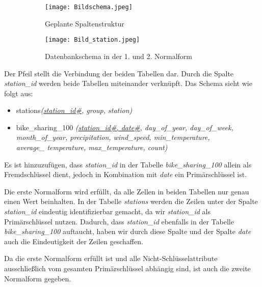 \documentclass[a4paper, 12pt]{article}
\begin{document}
\begin{figure}[ht]
    \centering
     \begin{subfigure}{0.25\textwidth}
        \centering
        \texttt{[image: Bildschema.jpeg]}
        \par Geplante Spaltenstruktur 
    \end{subfigure}
    \hfill
     \begin{subfigure}{0.72\textwidth}
        \centering
        \texttt{[image: Bild\_station.jpeg]}
        \par Datenbankschema in der 1. und 2. Normalform
    \end{subfigure}
\end{figure}

\newpage
Der Pfeil stellt die Verbindung der beiden Tabellen dar. Durch die Spalte \textit{station\_id} werden beide Tabellen miteinander verknüpft. Das Schema sieht wie folgt aus: 

\vspace{\baselineskip}

\begin{itemize}
    \item stations\textit{(\underline{station\_id\#}, group, station)}
    \item bike\_sharing\_100\textit{
    (\underline{station\_id\#, date\#}, day\_of\_year, day\_of\_week,\\ month\_of\_year, precipitation, wind\_speed, min\_temperature,\\ average\_
    temperature, max\_temperature, count)
}
\end{itemize}

\vspace{\baselineskip}

Es ist hinzuzufügen, dass \textit{station\_id} in der Tabelle \textit{bike\_sharing\_100} allein als Fremdschlüssel dient, jedoch in Kombination mit \textit{date} ein Primärschlüssel ist. 

Die erste Normalform wird erfüllt, da alle Zellen in beiden Tabellen nur genau einen Wert beinhalten. In der Tabelle \textit{stations} werden die Zeilen unter der Spalte \textit{station\_id} eindeutig identifizierbar gemacht, da wir \textit{station\_id} als Primärschlüssel
nutzen. Dadurch, dass \textit{station\_id} ebenfalls in der Tabelle \textit{bike\_sharing\_100} auftaucht, haben wir durch diese Spalte und der Spalte \textit{date} auch die Eindeutigkeit der Zeilen geschaffen.

Da die erste Normalform erfüllt ist und alle Nicht-Schlüsselattribute ausschließlich vom gesamten Primärschlüssel abhängig sind, ist auch die zweite Normalform gegeben.
\end{document}
